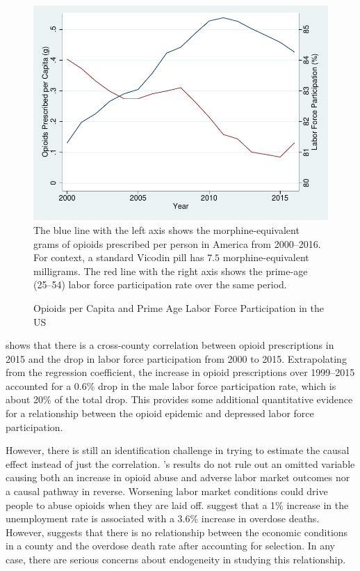 \documentclass[12pt]{article}
\begin{document}
\begin{figure}[htbp]
    \centering
    \caption{Opioids per Capita and Prime Age Labor Force Participation in the US}
    \begin{minipage}{0.8\textwidth}
    \includegraphics[width=\textwidth]{figs/graph_opioidlfp.pdf}
    \footnotesize
    The blue line with the left axis shows the morphine-equivalent grams of opioids prescribed per person in America from 2000--2016.  For context, a standard Vicodin pill has $7.5$ morphine-equivalent milligrams.  The red line with the right axis shows the prime-age (25--54) labor force participation rate over the same period.
    \end{minipage}
    \label{figure:opioidandlfp}
\end{figure}

\textcite{krueger17} shows that there is a cross-county correlation between opioid prescriptions in 2015 and the drop in labor force participation from 2000 to 2015.  Extrapolating from the regression coefficient, the increase in opioid prescriptions over 1999--2015 accounted for a 0.6\% drop in the male labor force participation rate, which is about 20\% of the total drop.  This provides some additional quantitative evidence for a relationship between the opioid epidemic and depressed labor force participation.

However, there is still an identification challenge in trying to estimate the causal effect instead of just the correlation.  \citeauthor{krueger17}'s results do not rule out an omitted variable causing both an increase in opioid abuse and adverse labor market outcomes nor a causal pathway in reverse.  Worsening labor market conditions could drive people to abuse opioids when they are laid off.  \textcite{hollingsworth17} suggest that a 1\% increase in the unemployment rate is associated with a $3.6\%$ increase in overdose deaths.  However, \textcite{ruhm18} suggests that there is no relationship between the economic conditions in a county and the overdose death rate after accounting for selection.  In any case, there are serious concerns about endogeneity in studying this relationship.
\end{document}

